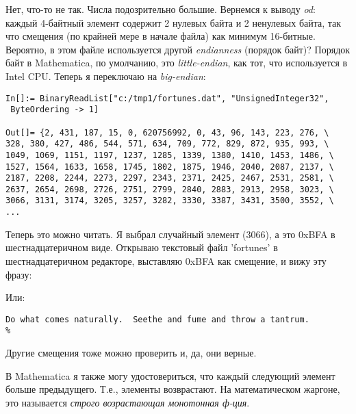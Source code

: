 Нет, что-то не так. Числа подозрительно большие.
Вернемся к выводу \emph{od}: каждый 4-байтный элемент содержит 2 нулевых байта и 2 ненулевых байта,
так что смещения (по крайней мере в начале файла) как минимум 16-битные.
Вероятно, в этом файле используется другой \emph{endianness} (порядок байт)?
Порядок байт в Mathematica, по умолчанию, это \emph{little-endian}, как тот, что используется в Intel CPU.
Теперь я переключаю на \emph{big-endian}:

\begin{lstlisting}[style=custommath]
In[]:= BinaryReadList["c:/tmp1/fortunes.dat", "UnsignedInteger32", 
 ByteOrdering -> 1]

Out[]= {2, 431, 187, 15, 0, 620756992, 0, 43, 96, 143, 223, 276, \
328, 380, 427, 486, 544, 571, 634, 709, 772, 829, 872, 935, 993, \
1049, 1069, 1151, 1197, 1237, 1285, 1339, 1380, 1410, 1453, 1486, \
1527, 1564, 1633, 1658, 1745, 1802, 1875, 1946, 2040, 2087, 2137, \
2187, 2208, 2244, 2273, 2297, 2343, 2371, 2425, 2467, 2531, 2581, \
2637, 2654, 2698, 2726, 2751, 2799, 2840, 2883, 2913, 2958, 3023, \
3066, 3131, 3174, 3205, 3257, 3282, 3330, 3387, 3431, 3500, 3552, \
...
\end{lstlisting}

Теперь это можно читать.
Я выбрал случайный элемент (3066), а это 0xBFA в шестнадцатеричном виде.
Открываю текстовый файл 'fortunes' в шестнадцатеричном редакторе, выставляю 0xBFA как смещение, и вижу эту фразу:



Или:

\begin{lstlisting}
Do what comes naturally.  Seethe and fume and throw a tantrum.
%
\end{lstlisting}

Другие смещения тоже можно проверить и, да, они верные.

В Mathematica я также могу удостовериться, что каждый следующий элемент больше предыдущего.
Т.е., элементы возврастают.
На математическом жаргоне, это называется \emph{строго возрастающая монотонная ф-ция}.

